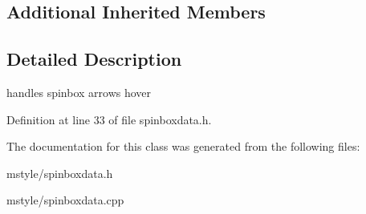 \subsection*{Additional Inherited Members}


\subsection{Detailed Description}
handles spinbox arrows hover 

Definition at line 33 of file spinboxdata.\+h.



The documentation for this class was generated from the following files\+:\begin{DoxyCompactItemize}
\item 
mstyle/spinboxdata.\+h\item 
mstyle/spinboxdata.\+cpp\end{DoxyCompactItemize}
